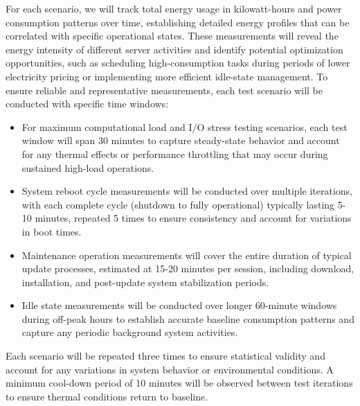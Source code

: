 For each scenario, we will track total energy usage in kilowatt-hours and power
consumption patterns over time, establishing detailed energy profiles that can be
correlated with specific operational states. These measurements will reveal the
energy intensity of different server activities and identify potential
optimization opportunities, such as scheduling high-consumption tasks during
periods of lower electricity pricing or implementing more efficient idle-state
management. To ensure reliable and representative measurements, each test scenario will be
conducted with specific time windows:

\begin{itemize}
    \item For maximum computational load and I/O stress testing scenarios, each
    test window will span 30 minutes to capture steady-state behavior and account
    for any thermal effects or performance throttling that may occur during
    sustained high-load operations.

    \item System reboot cycle measurements will be conducted over multiple
    iterations, with each complete cycle (shutdown to fully operational)
    typically lasting 5-10 minutes, repeated 5 times to ensure consistency and
    account for variations in boot times.

    \item Maintenance operation measurements will cover the entire duration of
    typical update processes, estimated at 15-20 minutes per session, including
    download, installation, and post-update system stabilization periods.

    \item Idle state measurements will be conducted over longer 60-minute windows
    during off-peak hours to establish accurate baseline consumption patterns and
    capture any periodic background system activities.
\end{itemize}

Each scenario will be repeated three times to ensure statistical validity and
account for any variations in system behavior or environmental conditions. A
minimum cool-down period of 10 minutes will be observed between test iterations
to ensure thermal conditions return to baseline.

